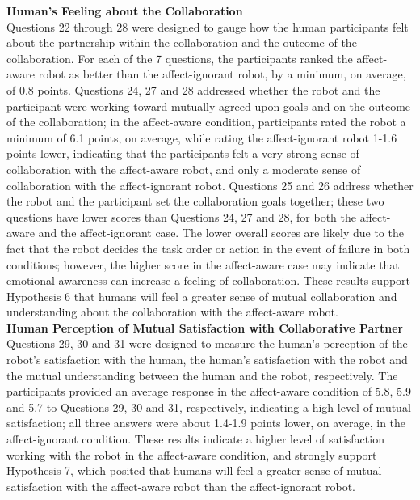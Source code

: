 \documentclass[12pt]{report}
\begin{document}
\hspace*{-8mm} \textbf{Human's Feeling about the Collaboration}
\label{sec:Collaboration}
\\Questions 22 through 28 were designed to gauge how the human participants
felt about the partnership within the collaboration and the outcome of the
collaboration. For each of the 7 questions, the participants ranked the
affect-aware robot as better than the affect-ignorant robot, by a minimum,
on average, of 0.8 points. Questions 24, 27 and 28 addressed whether the robot
and the participant were working toward mutually agreed-upon goals and on the
outcome of the collaboration; in the affect-aware condition, participants rated
the robot a minimum of 6.1 points, on average, while rating the affect-ignorant
robot 1-1.6 points lower, indicating that the participants felt a very strong
sense of collaboration with the affect-aware robot, and only a moderate sense
of collaboration with the affect-ignorant robot. Questions 25 and 26 address
whether the robot and the participant set the collaboration goals together;
these two questions have lower scores than Questions 24, 27 and 28, for both the
affect-aware and the affect-ignorant case. The lower overall scores are
likely due to the fact that the robot decides the task order or action in the
event of failure in both conditions; however, the higher score in the
affect-aware case may indicate that emotional awareness can increase a feeling
of collaboration. These results support Hypothesis 6 that humans will feel
a greater sense of mutual collaboration and understanding about the
collaboration with the affect-aware robot.\\

\hspace*{-8mm} \textbf{Human Perception of Mutual Satisfaction with
Collaborative Partner}
\label{sec:MutualSatisfaction}
\\ Questions 29, 30 and 31 were designed to measure the human's perception
of the robot's satisfaction with the human, the human's satisfaction with the
robot and the mutual understanding between the human and the robot,
respectively. The participants provided an average response in the affect-aware
condition of 5.8, 5.9 and 5.7 to Questions 29, 30 and 31, respectively,
indicating a high level of mutual satisfaction; all three answers were
about 1.4-1.9 points lower, on average, in the affect-ignorant condition. These
results indicate a higher level of satisfaction working with the robot in the
affect-aware condition, and strongly support Hypothesis 7, which posited that
humans will feel a greater sense of mutual satisfaction with the affect-aware
robot than the affect-ignorant robot.
\end{document}
